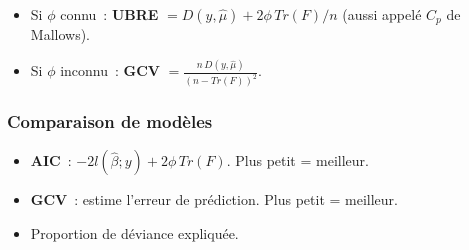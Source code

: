 \documentclass[11pt,letterpaper]{article}
\begin{document}
\begin{itemize}
\item Si $\phi$ connu~: \textbf{UBRE} $= D(y,\hat{\mu}) + 2\phi\,Tr(F)/n$ (aussi appelé $C_p$ de Mallows).
\item Si $\phi$ inconnu~: \textbf{GCV} $= \frac{n\,D(y,\hat{\mu})}{(n-Tr(F))^2}$.
\end{itemize}

\subsubsection{Comparaison de modèles}

\begin{itemize}
\item \textbf{AIC}~: $-2l(\hat{\beta};y) + 2\phi\,Tr(F)$. Plus petit = meilleur.
\item \textbf{GCV}~: estime l'erreur de prédiction. Plus petit = meilleur.
\item Proportion de déviance expliquée.
\end{itemize}

\newpage
\printbibliography
\end{document}
